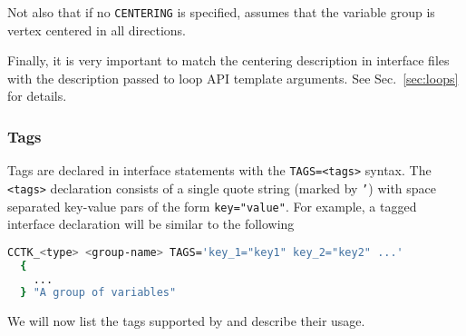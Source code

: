 Not also that if no \texttt{CENTERING} is specified, \CarpetX\space assumes that the variable group is vertex centered in all directions.

Finally, it is very important to match the centering description in interface files with the description passed to loop API template arguments. See Sec.~\ref{sec:loops} for details.

\subsubsection{Tags}

Tags are declared in interface statements with the \texttt{TAGS=<tags>} syntax. The \texttt{<tags>} declaration consists of a single quote string (marked by \texttt{'}) with space separated key-value pars of the form \texttt{key="value"}. For example, a tagged interface declaration will be similar to the following
%
\begin{lstlisting}[language=bash]
  CCTK_<type> <group-name> TAGS='key_1="key1" key_2="key2" ...'
  {
    ...
  } "A group of variables"
\end{lstlisting}

We will now list the tags supported by \CarpetX\space and describe their usage.

